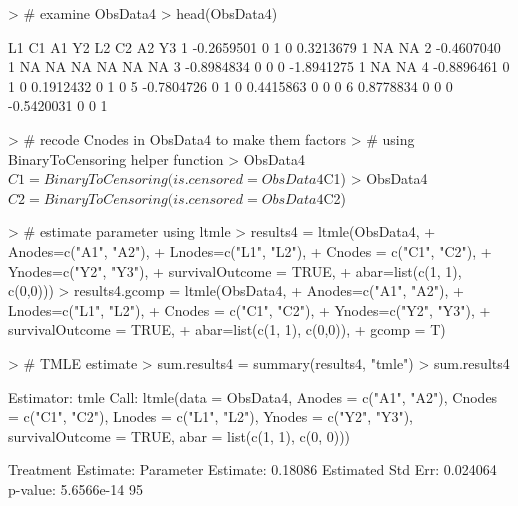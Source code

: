 \documentclass[answers]{exam}
\begin{document}
\begin{solution}
\begin{Schunk}
\begin{Sinput}
> # examine ObsData4
> head(ObsData4)
\end{Sinput}
\begin{Soutput}
          L1 C1 A1 Y2         L2 C2 A2 Y3
1 -0.2659501  0  1  0  0.3213679  1 NA NA
2 -0.4607040  1 NA NA         NA NA NA NA
3 -0.8984834  0  0  0 -1.8941275  1 NA NA
4 -0.8896461  0  1  0  0.1912432  0  1  0
5 -0.7804726  0  1  0  0.4415863  0  0  0
6  0.8778834  0  0  0 -0.5420031  0  0  1
\end{Soutput}
\end{Schunk}
\begin{Schunk}
\begin{Sinput}
> # recode Cnodes in ObsData4 to make them factors 
> # using BinaryToCensoring helper function
> ObsData4$C1 = BinaryToCensoring(is.censored = ObsData4$C1)
> ObsData4$C2 = BinaryToCensoring(is.censored = ObsData4$C2)
\end{Sinput}
\end{Schunk}
\begin{Schunk}
\begin{Sinput}
> # estimate parameter using ltmle
> results4 = ltmle(ObsData4, 
+                  Anodes=c("A1", "A2"), 
+                  Lnodes=c("L1", "L2"), 
+                  Cnodes = c("C1", "C2"),
+                  Ynodes=c("Y2", "Y3"),
+                  survivalOutcome = TRUE,
+                  abar=list(c(1, 1), c(0,0)))
> results4.gcomp = ltmle(ObsData4,
+                        Anodes=c("A1", "A2"),
+                        Lnodes=c("L1", "L2"),
+                        Cnodes = c("C1", "C2"),
+                        Ynodes=c("Y2", "Y3"),
+                        survivalOutcome = TRUE,
+                        abar=list(c(1, 1), c(0,0)),
+                        gcomp = T)
\end{Sinput}
\end{Schunk}
\begin{Schunk}
\begin{Sinput}
> # TMLE estimate
> sum.results4 = summary(results4, "tmle")
> sum.results4
\end{Sinput}
\begin{Soutput}
Estimator:  tmle 
Call:
ltmle(data = ObsData4, Anodes = c("A1", "A2"), Cnodes = c("C1", 
    "C2"), Lnodes = c("L1", "L2"), Ynodes = c("Y2", "Y3"), survivalOutcome = TRUE, 
    abar = list(c(1, 1), c(0, 0)))

Treatment Estimate:
   Parameter Estimate:  0.18086 
    Estimated Std Err:  0.024064 
              p-value:  5.6566e-14 
    95%


\end{Soutput}
\end{Schunk}
\end{solution}
\end{document}
